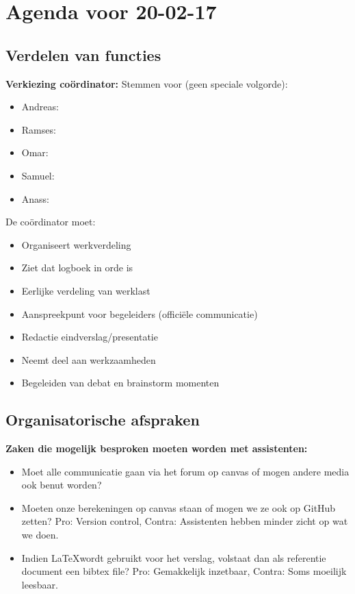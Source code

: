 \section{Agenda voor 20-02-17}%
\label{sec:Agenda voor 20-02-17}

\subsection{Verdelen van functies}%
\label{sub:Verdelen van functies}

\textbf{Verkiezing co\"ordinator:} Stemmen voor (geen speciale volgorde):
\begin{itemize}
	\item Andreas: 
	\item Ramses: 
	\item Omar:
	\item Samuel:
	\item Anass:
\end{itemize}

De co\"ordinator moet:
\begin{itemize}
	\item Organiseert werkverdeling
	\item Ziet dat logboek in orde is
	\item Eerlijke verdeling van werklast
	\item Aanspreekpunt voor begeleiders (offici\"ele communicatie)
	\item Redactie eindverslag/presentatie
	\item Neemt deel aan werkzaamheden
	\item Begeleiden van debat en brainstorm momenten
\end{itemize}

\subsection{Organisatorische afspraken}%
\label{sub:Organisatorische afspraken}

\textbf{Zaken die mogelijk besproken moeten worden met assistenten:} 
\begin{itemize}
	\item Moet alle communicatie gaan via het forum op canvas of mogen andere
		media ook benut worden?
	\item Moeten onze berekeningen op canvas staan of mogen we ze ook op GitHub
		zetten? Pro: Version control, Contra: Assistenten hebben minder zicht op 
		wat we doen.
	\item Indien \LaTeX wordt gebruikt voor het verslag, volstaat dan als referentie
		document een bibtex file? Pro: Gemakkelijk inzetbaar, Contra: Soms moeilijk
		leesbaar.
\end{itemize}

